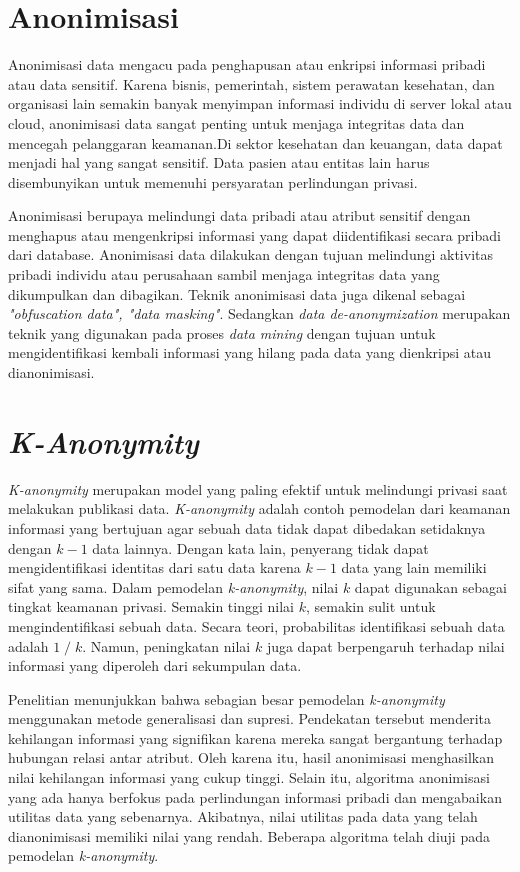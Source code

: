 \section{Anonimisasi}
\label{sec:anonimisasi}

Anonimisasi data mengacu pada penghapusan atau enkripsi informasi pribadi atau data sensitif. Karena bisnis, pemerintah, sistem perawatan kesehatan, dan organisasi lain semakin banyak menyimpan informasi individu di server lokal atau cloud, anonimisasi data sangat penting untuk menjaga integritas data dan mencegah pelanggaran keamanan.Di sektor kesehatan dan keuangan, data dapat menjadi hal yang sangat sensitif. Data pasien atau entitas lain harus disembunyikan untuk memenuhi persyaratan perlindungan privasi.

Anonimisasi berupaya melindungi data pribadi atau atribut sensitif dengan menghapus atau mengenkripsi informasi yang dapat diidentifikasi secara pribadi dari database. Anonimisasi data dilakukan dengan tujuan melindungi aktivitas pribadi individu atau perusahaan sambil menjaga integritas data yang dikumpulkan dan dibagikan. Teknik anonimisasi data juga dikenal sebagai {\it "obfuscation data", "data masking"}. Sedangkan {\it data de-anonymization} merupakan teknik yang digunakan pada proses {\it data mining} dengan tujuan untuk mengidentifikasi kembali informasi yang hilang pada data yang dienkripsi atau dianonimisasi.

\section{\textit{K-Anonymity}}
\textit{K-anonymity} merupakan model yang paling efektif untuk melindungi privasi saat melakukan publikasi data. \textit{K-anonymity} adalah contoh pemodelan dari keamanan informasi yang bertujuan agar sebuah data tidak dapat dibedakan setidaknya dengan $k-1$ data lainnya. Dengan kata lain, penyerang tidak dapat mengidentifikasi identitas dari satu data karena $k-1$ data yang lain memiliki sifat yang sama. Dalam pemodelan {\it k-anonymity}, nilai $k$ dapat digunakan sebagai tingkat keamanan privasi. Semakin tinggi nilai $k$, semakin sulit untuk mengindentifikasi sebuah data. Secara teori, probabilitas identifikasi sebuah data adalah $1\;/\;k$. Namun, peningkatan nilai $k$ juga dapat berpengaruh terhadap nilai informasi yang diperoleh dari sekumpulan data.

\par Penelitian menunjukkan bahwa sebagian besar pemodelan \textit{k-anonymity} menggunakan metode generalisasi dan supresi. Pendekatan tersebut menderita kehilangan informasi yang signifikan karena mereka sangat bergantung terhadap hubungan relasi antar atribut. Oleh karena itu, hasil anonimisasi menghasilkan nilai kehilangan informasi yang cukup tinggi. Selain itu, algoritma anonimisasi yang ada hanya berfokus pada perlindungan informasi pribadi dan mengabaikan utilitas data yang sebenarnya. Akibatnya, nilai utilitas pada data yang telah dianonimisasi memiliki nilai yang rendah. Beberapa algoritma telah diuji pada pemodelan \textit{k-anonymity}.\\

